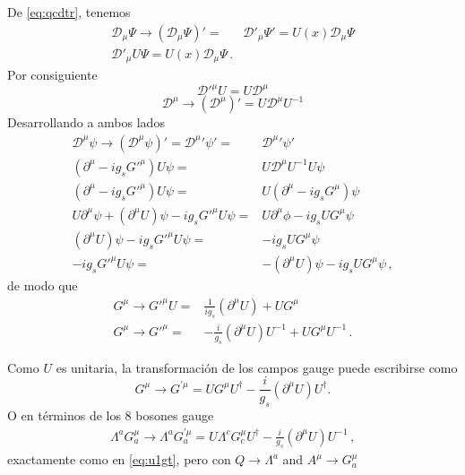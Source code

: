 De \eqref{eq:qcdtr}, tenemos
\begin{align}
   \mathcal{D}_\mu\Psi\to \left(\mathcal{D}_\mu\Psi\right)'=&\mathcal{D}'_\mu\Psi'
  =U(x)\mathcal{D}_\mu\Psi\nonumber\\
\mathcal{D}'_\mu U\Psi
  =U(x)\mathcal{D}_\mu\Psi\,.
\end{align}
Por consiguiente
\begin{equation}
  {\mathcal{D}'}^\mu U=U\mathcal{D}^\mu
\end{equation}
\begin{equation}
  \mathcal{D}^\mu\to\left(
    \mathcal{D}^\mu
  \right)'=U\mathcal{D}^\mu U^{-1}
\end{equation}
Desarrollando a ambos lados
\begin{align}
  \label{eq:251qft}
   {\mathcal{D}}^\mu\psi\to{\left({\mathcal{D}}^\mu\psi\right)}'=
  {\mathcal{D}^\mu}'\psi'=&{\mathcal{D}^\mu}'\psi'\nonumber\\
  (\partial^\mu-i g_s {G'}^\mu) U\psi=&U\mathcal{D}^\mu U^{-1}U\psi\nonumber\\
  (\partial^\mu-i g_s {G'}^\mu) U\psi=&U(\partial^\mu-i g_s {G}^\mu)\psi\nonumber\\
  U\partial^\mu\psi+(\partial^\mu U)\psi-i g_s {G'}^\mu U \psi=&U\partial^\mu\phi-i g_s U {G}^\mu \psi\nonumber\\
  (\partial^\mu U)\psi-i g_s {G'}^\mu U \psi=&-i g_s U {G}^\mu \psi\nonumber\\
  -i g_s {G'}^\mu U \psi=&-(\partial^\mu U)\psi-i g_s U {G}^\mu \psi\,,
\end{align}
de modo que
\begin{align}
 G^{\mu}\to     {G'}^\mu U =&\frac{1}{i g_s}(\partial^\mu U)+ U{G}^\mu \nonumber\\
 G^{\mu}\to  {G'}^\mu  =&-\frac{i}{g_s}(\partial^\mu U)U^{-1}+ U{G}^\mu U^{-1}\,.
\end{align}

Como $U$ es unitaria, la transformación de los campos gauge puede escribirse como
\begin{equation}
    {G}^\mu\to{G}^{\prime \mu}=U{G}^\mu U^{\dagger}-\frac{i}{g_s}\left(\partial^\mu U\right)U^\dagger.
\end{equation}
O en términos de los 8 bosones gauge
\begin{align}
  \Lambda^a{G}^\mu_a\to\Lambda^a{G}^{\prime \mu}_a=U\Lambda^c{G}^\mu_c U^{\dagger}-\frac{i}{g_s}(\partial^\mu U)U^{-1}\,,
\end{align}
exactamente como en \eqref{eq:u1gt}, pero con $Q\to \Lambda^a$ and $A^\mu\to G^\mu_a$

